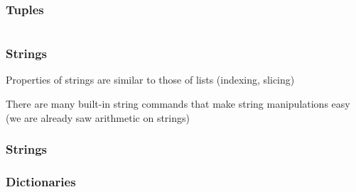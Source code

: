\documentclass{beamer}
\begin{document}
\begin{frame}
\frametitle{Tuples}

\begin{center}
\begin{tabular}{c}

\end{tabular}
\end{center}

\end{frame}

\begin{frame}
\frametitle{Strings}
Properties of strings are similar to those of lists (indexing, slicing)

\vspace{0.1in}

There are many built-in string commands that make string manipulations easy (we are already saw arithmetic on strings)

\end{frame}


\begin{frame}
\frametitle{Strings}


\end{frame}


\begin{frame}
\frametitle{Dictionaries}


\end{frame}
\end{document}
